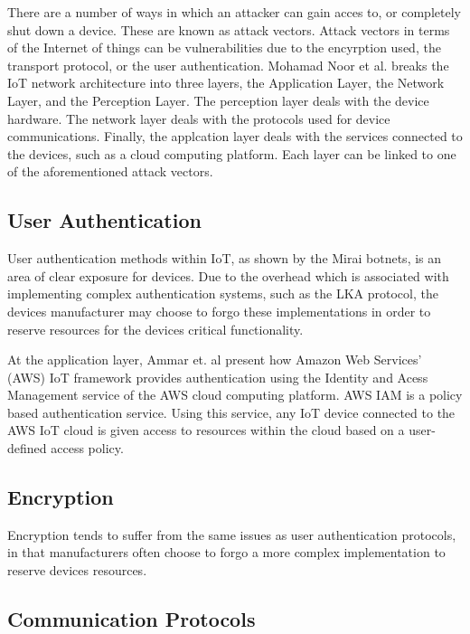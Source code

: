 There are a number of ways in which an attacker can gain acces to, or completely
shut down a device. These are known as attack vectors. Attack vectors in terms
of the Internet of things can be vulnerabilities due to the encyrption used, the
transport protocol, or the user authentication. Mohamad Noor et al. breaks the
IoT network architecture into three layers, the Application Layer, the Network
Layer, and the Perception Layer\cite{mohamadSec}. The perception layer deals
with the device hardware. The network layer deals with the protocols used for
device communications. Finally, the applcation layer deals with the services
connected to the devices, such as a cloud computing platform. Each layer can be
linked to one of the aforementioned attack vectors.

\subsection{User Authentication}

User authentication methods within IoT, as shown by the Mirai botnets, is an
area of clear exposure for devices. Due to the overhead which is associated with
implementing complex authentication systems, such as the LKA
protocol\cite{mohamadSec}, the devices manufacturer may choose to forgo these
implementations in order to reserve resources for the devices critical
functionality.

At the application layer, Ammar et. al present how Amazon Web Services' (AWS)
IoT framework provides authentication using the Identity and Acess Management
service of the AWS cloud computing platform\cite{ammarSec}. AWS IAM is a policy
based authentication service. Using this service, any IoT device connected to
the AWS IoT cloud is given access to resources within the cloud based on a
user-defined access policy.

\subsection{Encryption}

Encryption tends to suffer from the same issues as user authentication
protocols, in that manufacturers often choose to forgo a more complex
implementation to reserve devices resources.

\subsection{Communication Protocols}


